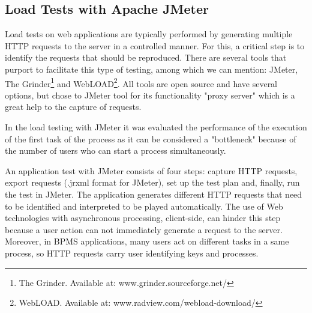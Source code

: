 \documentclass[runningheads,a4paper]{llncs}
\begin{document}


\subsection{Load Tests with Apache JMeter}
Load tests on web applications are typically performed by generating multiple HTTP requests to the server in a controlled manner. For this, a critical step is to identify the requests that should be reproduced. There are several tools that purport to facilitate this type of testing, among which we can mention: JMeter, The Grinder\footnote{The Grinder. Available at: www.grinder.sourceforge.net/} and WebLOAD\footnote{WebLOAD. Available at: www.radview.com/webload-download/}. All tools are open source and have several options, but chose to JMeter tool for its functionality "proxy server" which is a great help to the capture of requests.

In the load testing with JMeter it was evaluated the performance of the execution of the first task of the process as it can be considered a "bottleneck" because of the number of users who can start a process simultaneously.

An application test with JMeter consists of four steps: capture HTTP requests, export requests (.jrxml format for JMeter), set up the test plan and, finally, run the test in JMeter. The application generates different HTTP requests that need to be identified and interpreted to be played automatically. The use of Web technologies with asynchronous processing, client-side, can hinder this step because a user action can not immediately generate a request to the server. Moreover, in BPMS applications, many users act on different tasks in a same process, so HTTP requests carry user identifying keys and processes.
\end{document}
